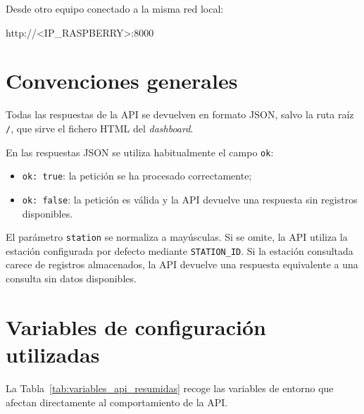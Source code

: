 Desde otro equipo conectado a la misma red local:

\begin{terminaloutput}
http://<IP_RASPBERRY>:8000
\end{terminaloutput}

\section{Convenciones generales}

Todas las respuestas de la API se devuelven en formato JSON, salvo la ruta raíz \texttt{/}, que sirve el fichero HTML del \textit{dashboard}.

En las respuestas JSON se utiliza habitualmente el campo \texttt{ok}:

\begin{itemize}
    \item \texttt{ok: true}: la petición se ha procesado correctamente;
    \item \texttt{ok: false}: la petición es válida y la API devuelve una respuesta sin registros disponibles.
\end{itemize}

El parámetro \texttt{station} se normaliza a mayúsculas. Si se omite, la API utiliza la estación configurada por defecto mediante \texttt{STATION\_ID}. Si la estación consultada carece de registros almacenados, la API devuelve una respuesta equivalente a una consulta sin datos disponibles.

\section{Variables de configuración utilizadas}

La Tabla~\ref{tab:variables_api_resumidas} recoge las variables de entorno que afectan directamente al comportamiento de la API.

